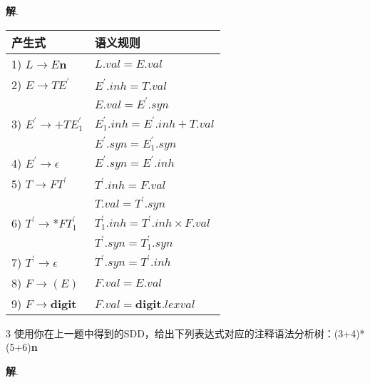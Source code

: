 \documentclass[12pt,a4paper]{article}
\newenvironment{problems}{\begin{list}{}{\renewcommand{\makelabel}[1]{\textbf{##1}\hfil}}}{\end{list}}
\providecommand{\sol}{\textbf{解}.~}
\begin{document}
\begin{problems}
    \sol 

    \begin{table}[H]
        \centering
        \begin{tabular}{ll}
            \hline
            产生式 & 语义规则 \\
            \hline
            1) $L\rightarrow E$\textbf{n} & $L.val=E.val$\\
            2) $E\rightarrow TE^\prime$ & $E^\prime .inh = T.val$ \\
            & $E.val=E^\prime .syn$\\
            3) $E^\prime \rightarrow +TE_1^\prime$ & $E_1^\prime .inh = E^\prime .inh + T.val$\\
            & $E^\prime .syn = E_1^\prime .syn$ \\
            4) $E^\prime \rightarrow \epsilon$ & $E^\prime .syn = E^\prime .inh$\\
            5) $T\rightarrow FT^\prime$ &
                $T^\prime .inh=F.val$\\
                & $T.val = T^\prime .syn$ \\
            6) $T^\prime \rightarrow *FT_1^\prime$ & $T_1^\prime .inh=T^\prime .inh\times F.val$\\
                & $T^\prime .syn=T_1^\prime .syn$\\
            7) $T^\prime \rightarrow \epsilon$ & $T^\prime .syn = T^\prime .inh$\\
            8) $F\rightarrow (E)$ & $F.val = E.val$\\
            9) $F\rightarrow$\textbf{digit} & $F.val=$\textbf{digit}$.lexval$\\
            \hline
        \end{tabular} 
    \end{table}

    \newpage
 
    \item[3] 使用你在上一题中得到的SDD，给出下列表达式对应的注释语法分析树：(3+4)*(5+6)\textbf{n}  
    
    \sol \begin{figure}[H]
        \centering
        
    \end{figure}
\end{problems}
\end{document}
